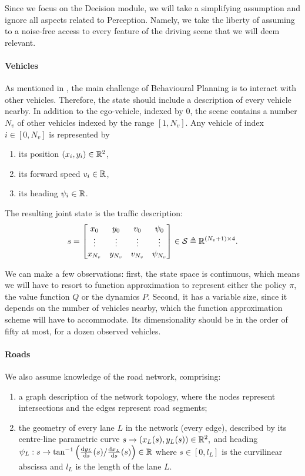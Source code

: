 Since we focus on the Decision module, we will take a simplifying assumption and ignore all aspects related to Perception.
Namely, we take the liberty of assuming to a noise-free access to every feature of the driving scene that we will deem relevant.

\paragraph{Vehicles}

As mentioned in , the main challenge of Behavioural Planning is to interact with other vehicles. Therefore, the state should include a description of every vehicle nearby. In addition to the ego-vehicle, indexed by 0, the scene contains a number $N_v$ of other vehicles indexed by the range $[1, N_v]$.
Any vehicle of index $i\in[0,N_v]$ is represented by 
\begin{enumerate}[label=(\roman*)]
	\item its position $(x_i, y_i)\in\mathbb{R}^2$,
	\item its forward speed $v_i\in\mathbb{R}$, 
	\item its heading $\psi_i\in\mathbb{R}$.
\end{enumerate}

The resulting joint state is the traffic description: 
$$s = \begin{bmatrix}
x_0 & y_0 & v_0 & \psi_0\\
\vdots & \vdots & \vdots & \vdots\\
x_{N_v} & y_{N_v} & v_{N_v} & \psi_{N_v}\\
\end{bmatrix}
\in\cS \eqdef\Real^{(N_v+1) \times 4}.$$

We can make a few observations: first, the state space is continuous, which means we will have to resort to function approximation to represent either the policy $\pi$, the value function $Q$ or the dynamics $P$. Second, it has a variable size, since it depends on the number of vehicles nearby, which the function approximation scheme will have to accommodate. Its dimensionality should be in the order of fifty at most, for a dozen observed vehicles.

\paragraph{Roads}

We also assume knowledge of the road network, comprising:
\begin{enumerate}[label=(\roman*)]
	\item a graph description of the network topology, where the nodes represent intersections and the edges represent road segments;
	\item the geometry of every lane $L$ in the network (every edge), described by its centre-line parametric curve
	$
	s \rightarrow (x_{L}(s), y_{L}(s))\in \mathbb{R}^2,
	$
	\noindent and heading $\psi_L:s \rightarrow \tan^{-1}\left({\odv{y_L}{s}(s)}/{\odv{x_L}{s}(s)}\right) \in \Real$
	where $s\in[0, l_L]$ is the curvilinear abscissa and $l_L$ is the length of the lane $L$.
\end{enumerate}


